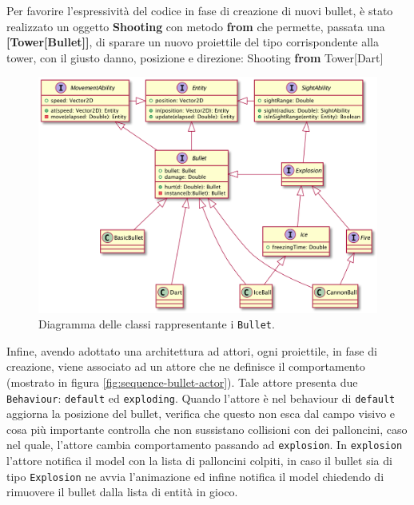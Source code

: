 Per favorire l'espressività del codice in fase di creazione di nuovi bullet, è stato realizzato un oggetto
\textbf{Shooting} con metodo \textbf{from} che permette, passata una \textbf{[Tower[Bullet]]},
di sparare un nuovo proiettile del tipo corrispondente alla tower, con il giusto danno, posizione e direzione:
Shooting \textbf{from} Tower[Dart]

\begin{figure}[H]
    \centering
    \includegraphics[width=1\linewidth]{img/class-bullet}
    \caption{Diagramma delle classi rappresentante i \texttt{Bullet}.}
    \label{fig:class-bullet}
\end{figure}

Infine, avendo adottato una architettura ad attori, ogni proiettile, in fase di creazione, viene associato ad un attore che ne definisce
il comportamento (mostrato in figura \ref{fig:sequence-bullet-actor}).
Tale attore presenta due \texttt{Behaviour}: \texttt{default} ed \texttt{exploding}.
Quando l'attore è nel behaviour di \texttt{default} aggiorna la posizione del bullet, verifica che questo non esca dal campo visivo e
cosa più importante controlla che non sussistano collisioni con dei palloncini, caso nel quale, l'attore cambia comportamento
passando ad \texttt{explosion}.
In \texttt{explosion} l'attore notifica il model con la lista di palloncini colpiti, in caso il bullet sia di tipo
\texttt{Explosion} ne avvia l'animazione ed infine notifica il model chiedendo di rimuovere il bullet dalla lista di entità
in gioco.

